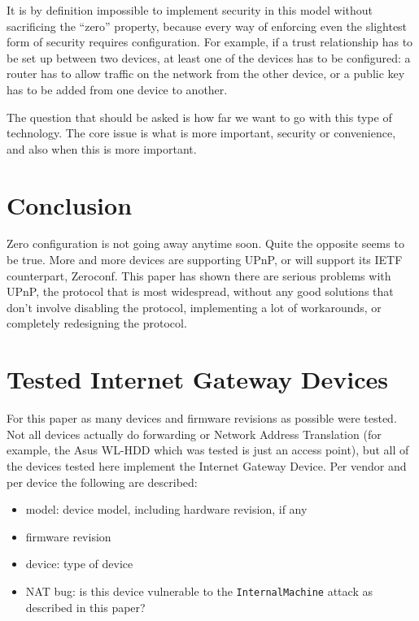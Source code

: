 \documentclass[10pt]{article}
\begin{document}
It is by definition impossible to implement security in this model without
sacrificing the ``zero'' property, because every way of enforcing even the
slightest form of security requires configuration. For example, if a trust
relationship has to be set up between two devices, at least one of the devices
has to be configured: a router has to allow traffic on the network from the
other device, or a public key has to be added from one device to another.

The question that should be asked is how far we want to go with this type of
technology. The core issue is what is more important, security or convenience,
and also when this is more important.

\section{Conclusion}

Zero configuration is not going away anytime soon. Quite the opposite seems
to be true. More and more devices are supporting UPnP, or will support its
IETF counterpart, Zeroconf. This paper has shown there are serious problems
with UPnP, the protocol that is most widespread, without any good solutions
that don't involve disabling the protocol, implementing a lot of
workarounds, or completely redesigning the protocol.

\appendix

\section{Tested Internet Gateway Devices}

For this paper as many devices and firmware revisions as possible
were tested. Not all devices actually do forwarding or Network Address
Translation (for example, the Asus WL-HDD which was tested is just an access
point), but all of the devices tested here implement the Internet Gateway
Device. Per vendor and per device the following are described:

\begin{itemize}
\item model: device model, including hardware revision, if any
\item firmware revision
\item device: type of device
\item NAT bug: is this device vulnerable to the \texttt{InternalMachine}
attack as described in this paper?
\end{itemize}
\end{document}

